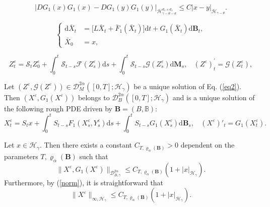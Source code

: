 \documentclass[10pt,a4paper]{amsart}
\begin{document}
\begin{equation}\label{DG1G1}
	|DG_1(x)G_1(x)-DG_1(y)G_1(y)|_{\mathcal{H}_{\gamma-\theta-\sigma}^{d_1 \times d_1}}\leq  C |x-y|_{\mathcal H_{\gamma-\theta}}.
\end{equation}	

\begin{equation}\label{aveq}
	\left\{ \begin{aligned}
		\mathrm{d} \bar{X}_t&=\big[ L \bar{X}_t+\bar{F}_1 (\bar{X}_t)\big] \mathrm{d} t+G_1(\bar{X}_t)\mathrm{d} \mathbf B_t,\\
		\bar{X}_0&=x,
	\end{aligned} \right.
\end{equation}

\begin{equation} \label{eq2}
Z_t^\varepsilon= \mathcal S_t Z_0^\varepsilon+\int_0^t \mathcal{S}_{t-s} \mathcal F(Z_s^\varepsilon) \mathrm{d} s+\int_0^t \mathcal{S}_{t-s} \mathcal G(Z_s^\varepsilon) \mathrm{d} \mathbf M_s,  ~~~~(Z^\varepsilon)_t^\prime=\mathcal G(Z_t^\varepsilon),
\end{equation}

\begin{lemma}
Let $(Z^\varepsilon, \mathcal G(Z^\varepsilon)) \in \mathcal{D}_{M}^{2\alpha}([0,T];\mathscr{H}_\gamma)$ be a unique solution of Eq. (\ref{eq2}).
Then $(X^\varepsilon, G_1(X^\varepsilon))$ belongs to $\mathcal D_{B}^{2\alpha}([0,T];\mathcal{H}_\gamma)$ and is a unique solution of the following rough PDE driven by $\mathbf B=(B,\mathbb B)$:
\begin{equation}\label{sloweq}
X_t^\varepsilon=S_t x+\int_0^t S_{t-s} F_1 (X_s^\varepsilon,Y_s^\varepsilon) \mathrm{d} s+ \int_0^t S_{t-s} G_1 (X_s^\varepsilon) \mathrm{d} \mathbf{B}_s, ~~~~(X^\varepsilon)'_t=G_1 (X_t^\varepsilon).
\end{equation}
\end{lemma}

	\begin{lemma}\label{slowest}	
		Let $x \in \mathcal H_\gamma$. Then there exists a constant $C_{T,\varrho_{\alpha}(\mathbf{B})}>0$ dependent on the parameters $T,\varrho_{\alpha}(\mathbf{B})$ such that	
		\begin{equation}\label{X1}
			\|X^\varepsilon,G_1(X^\varepsilon)\|_{\mathcal{D}_{B,\gamma}^{2\alpha}} \leq C_{T,\varrho_{\alpha}(\mathbf{B})} (1+|x|_{\mathcal H_\gamma}).
		\end{equation}
		Furthermore, by (\ref{norm}), it is straightforward that
		\begin{equation}\label{X2}	
		\|X^\varepsilon\|_{\infty, \mathcal H_\gamma} \leq C_{T,\varrho_{\alpha}(\mathbf{B})} (1+|x|_{\mathcal H_\gamma}).	
		\end{equation}	
	\end{lemma}
\end{document}
